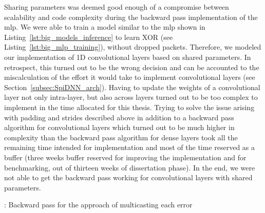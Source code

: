 \documentclass[]{article}
\begin{document}
Sharing parameters was deemed good enough of a compromise between
scalability and code complexity during the backward pass
implementation of the \acrshort{mlp}.
We were able to train a model similar to the \acrshort{mlp} shown in
Listing~\ref{lst:big_models_inference} to learn XOR
(see Listing~\ref{lst:big_mlp_training}), without dropped packets.
Therefore, we modeled our implementation of 1D convolutional layers
based on shared parameters.
In retrospect, this turned out to be the wrong decision and can be
accounted to the miscalculation of the effort it would take to
implement convolutional layers (see Section~\ref{subsec:SpiDNN_arch}).
Having to update the weights of a convolutional layer
not only intra-layer, but also across layers turned out to be too
complex to implement in the time allocated for this thesis.
Trying to solve the issue arising with padding and strides described
above in addition to a backward pass algorithm for convolutional
layers which turned out to be much higher in complexity than the
backward pass algorithm for dense layers took all the remaining time
intended for implementation and most of the time reserved as a
buffer (three weeks buffer reserved for improving the implementation
and for benchmarking, out of thirteen weeks of dissertation phase).
In the end, we were not able to get the backward pass working for
convolutional layers with shared parameters.

\begin{algorithm} %
  \caption{: Backward pass for the approach of multicasting each
    error}
  \label{alg:multicast_error}

  \begin{algorithmic}[1]
    \ENDFOR
  \end{algorithmic}
\end{algorithm} %
\end{document}
